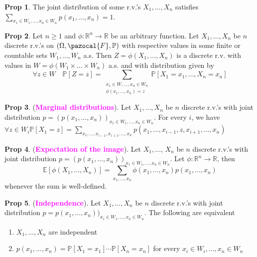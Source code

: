 \documentclass[8pt,a4paper,landscape]{article}
\theoremstyle{definition}
\theoremstyle{example}
\theoremstyle{intuition}
\theoremstyle{definition}
\newtheorem{proposition}{Prop}[section]
\newcommand{\Fb}{\pazocal{F}}
\newcommand{\mydef}[1]{\textcolor{magenta}{\textbf{#1}}}
\newcommand{\prob}[1]{\mathbb{P}\left[ #1 \right]}
\newcommand{\expec}[1]{\mathbb{E}\left[ #1 \right]}
\begin{document}
\begin{multicols}{3}
			\begin{proposition}
				The joint distribution of some r.v.'s $X_1, \ldots, X_n$ satisfies 
				$
					\sum_{x_1 \in W_1, \ldots, x_n \in W_n} p(x_1, \ldots, x_n) = 1
				$.
			\end{proposition}

			\begin{proposition}
				Let $n \geq 1$ and $\phi : \mathbb{R}^n \to \mathbb{R}$ be an arbitrary function. Let $X_1, \ldots, X_n$ be $n$ discrete r.v.'s on $(\Omega, \Fb, \mathbb{P})$ with respective values in some finite or countable sets $W_1, \ldots, W_n$ a.s. Then $Z = \phi(X_1, \ldots, X_n)$ is a discrete r.v. with values in $W = \phi(W_1 \times \ldots \times W_n)$ a.s. and with distribution given by
				$$
				\forall z \in W \quad \prob{Z = z} = \sum\limits_{\substack{x_1 \in W, \ldots, x_n \in W_n\\ \phi(x_1, \ldots, x_n) = z}} \prob{X_1 = x_1, \ldots, X_n = x_n}
				$$
			\end{proposition}

			\begin{proposition}
				(\mydef{Marginal distributions}). Let $X_1, \ldots, X_n$ be $n$ discrete r.v.'s with joint distribution $p = (p(x_1, \ldots, x_n))_{x_1 \in W_1, \ldots, x_n \in W_n}$. For every $i$, we have $\forall z \in W_i
					\prob{X_1 = z} = \sum\limits_{x_1, \ldots, x_{i-1}, x_{i+1}, \ldots, x_n} p(x_1, \ldots, x_{i-1}, z, x_{i+1}, \ldots, x_n)
				$
			\end{proposition}

			\begin{proposition}
				(\mydef{Expectation of the image}).
				Let $X_1, \ldots$, $X_n$ be $n$ discrete r.v.'s with joint distribution $p = (p(x_1, \ldots, x_n))_{x_1 \in W_1, \ldots, x_n \in W_n}$. Let $\phi : \mathbb{R}^n \to \mathbb{R}$, then
				$$
					\expec{\phi(X_1, \ldots, X_n)} = \sum_{x_1, \ldots, x_n} \phi(x_1, \ldots, x_n)p(x_1, \ldots, x_n)
				$$
				whenever the sum is well-defined.
			\end{proposition}

			\begin{proposition}
				(\mydef{Independence}).
				Let $X_1, \ldots, X_n$ be $n$ discrete r.v.'s with joint distribution $p = p(x_1, \ldots, x_n))_{x_1 \in W_1, \ldots, x_n \in W_n}$. The following are equivalent
				\begin{enumerate}[label=\roman*.]
					\item $X_1, \ldots, X_n$ are independent
					\item $p(x_1, \ldots, x_n) = \prob{X_1 = x_1} \cdots \prob{X_n = x_n}$ for every $x_i \in W_i, \ldots, x_n \in W_n$
				\end{enumerate}
			\end{proposition}



\end{multicols}
\end{document}
